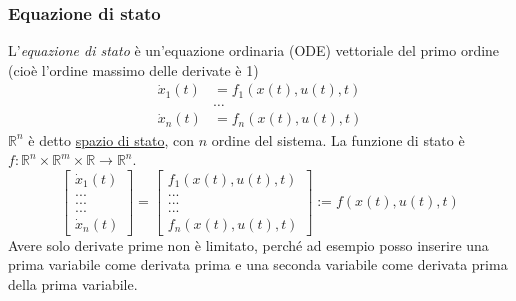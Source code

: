 \documentclass{article}
\begin{document}
\subsubsection{Equazione di stato}
L'\textit{equazione di stato} è un'equazione ordinaria (ODE) vettoriale del primo ordine (cioè l'ordine massimo delle derivate è 1)
\begin{align*}
    \dot x_1(t) &= f_1 \left(x(t), u(t), t\right)\\
    &\dots\\
    \dot x_n (t) &= f_n \left(x(t), u(t), t\right)
\end{align*}
$\mathbb{R}^n$ è detto \underline{spazio di stato}, con $n$ ordine del sistema. La funzione di stato è $f: \mathbb{R}^n \times \mathbb{R}^m \times \mathbb{R} \rightarrow \mathbb{R}^n$.
\[
    \begin{bmatrix}
        \dot x_1(t)\\
        ...\\
        ...\\
        ...\\
        \dot x_n(t)
    \end{bmatrix} 
    =
    \begin{bmatrix}
        f_1\left(x(t),u(t),t\right)\\
        ...\\
        ...\\
        ...\\
        f_n\left(x(t),u(t),t\right)
    \end{bmatrix}
    := f\left(x(t),u(t),t\right)
\]
Avere solo derivate prime non è limitato, perché ad esempio posso inserire una prima variabile come derivata prima e una seconda variabile come derivata prima della prima variabile.
\end{document}
